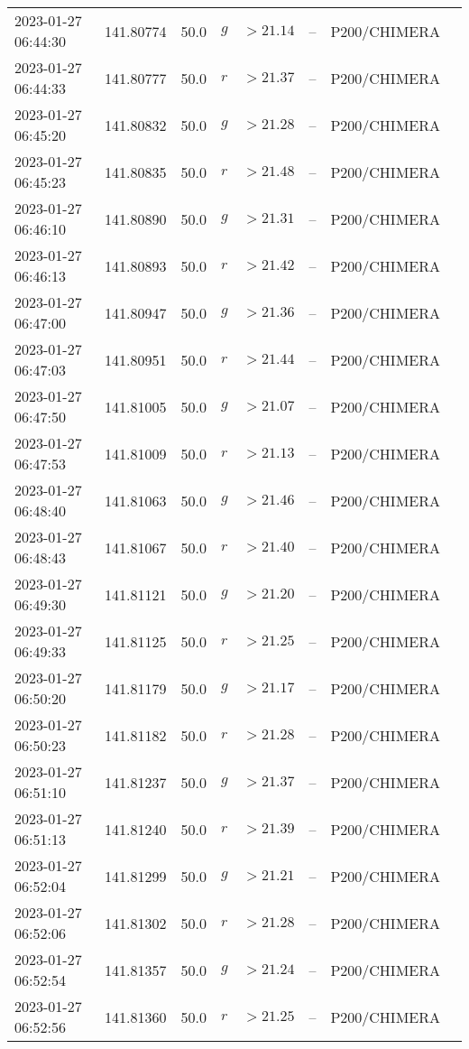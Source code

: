 \documentclass{nature_plusfigure}
\begin{document}
\begin{supplement}
\begin{center}
\begin{longtable}{llllllll}
2023-01-27 06:44:30 & 141.80774 & 50.0 & $g$ & $>21.14$ & -- & P200/CHIMERA &  \\ 
2023-01-27 06:44:33 & 141.80777 & 50.0 & $r$ & $>21.37$ & -- & P200/CHIMERA &  \\ 
2023-01-27 06:45:20 & 141.80832 & 50.0 & $g$ & $>21.28$ & -- & P200/CHIMERA &  \\ 
2023-01-27 06:45:23 & 141.80835 & 50.0 & $r$ & $>21.48$ & -- & P200/CHIMERA &  \\ 
2023-01-27 06:46:10 & 141.80890 & 50.0 & $g$ & $>21.31$ & -- & P200/CHIMERA &  \\ 
2023-01-27 06:46:13 & 141.80893 & 50.0 & $r$ & $>21.42$ & -- & P200/CHIMERA &  \\ 
2023-01-27 06:47:00 & 141.80947 & 50.0 & $g$ & $>21.36$ & -- & P200/CHIMERA &  \\ 
2023-01-27 06:47:03 & 141.80951 & 50.0 & $r$ & $>21.44$ & -- & P200/CHIMERA &  \\ 
2023-01-27 06:47:50 & 141.81005 & 50.0 & $g$ & $>21.07$ & -- & P200/CHIMERA &  \\ 
2023-01-27 06:47:53 & 141.81009 & 50.0 & $r$ & $>21.13$ & -- & P200/CHIMERA &  \\ 
2023-01-27 06:48:40 & 141.81063 & 50.0 & $g$ & $>21.46$ & -- & P200/CHIMERA &  \\ 
2023-01-27 06:48:43 & 141.81067 & 50.0 & $r$ & $>21.40$ & -- & P200/CHIMERA &  \\ 
2023-01-27 06:49:30 & 141.81121 & 50.0 & $g$ & $>21.20$ & -- & P200/CHIMERA &  \\ 
2023-01-27 06:49:33 & 141.81125 & 50.0 & $r$ & $>21.25$ & -- & P200/CHIMERA &  \\ 
2023-01-27 06:50:20 & 141.81179 & 50.0 & $g$ & $>21.17$ & -- & P200/CHIMERA &  \\ 
2023-01-27 06:50:23 & 141.81182 & 50.0 & $r$ & $>21.28$ & -- & P200/CHIMERA &  \\ 
2023-01-27 06:51:10 & 141.81237 & 50.0 & $g$ & $>21.37$ & -- & P200/CHIMERA &  \\ 
2023-01-27 06:51:13 & 141.81240 & 50.0 & $r$ & $>21.39$ & -- & P200/CHIMERA &  \\ 
2023-01-27 06:52:04 & 141.81299 & 50.0 & $g$ & $>21.21$ & -- & P200/CHIMERA &  \\ 
2023-01-27 06:52:06 & 141.81302 & 50.0 & $r$ & $>21.28$ & -- & P200/CHIMERA &  \\ 
2023-01-27 06:52:54 & 141.81357 & 50.0 & $g$ & $>21.24$ & -- & P200/CHIMERA &  \\ 
2023-01-27 06:52:56 & 141.81360 & 50.0 & $r$ & $>21.25$ & -- & P200/CHIMERA &  \\ 

\end{longtable}
\end{center}
\end{supplement}
\end{document}
